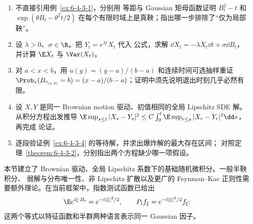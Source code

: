 \begin{exercise}
\begin{enumerate}
  \item 不直接引用例~\ref{ex:6-4-3-1}，分别用 \Ito{} 等距与 Gaussian 矩母函数证明
  $B_t^2-t$ 和
  $\exp(\theta B_t-\theta^2t/2)$ 在每个有限时域上是真鞅；指出哪一步排除了“仅为局部鞅”。
  \item 设 $\lambda>0$、$\sigma\in\R$。把
  $Y_t=e^{\lambda t}X_t$ 代入 \Ito{} 公式，求解
  $\dd X_t=-\lambda X_t\dd t+\sigma\dd B_t$，并计算 $\E X_t$ 与 $\Var(X_t)$。
  \item 对 $a<x<b$，用 $u(y)=(y-a)/(b-a)$ 和连续时间可选抽样重证
  $\Prob_x(B_{\tau_{(a,b)}}=b)=(x-a)/(b-a)$；证明中须先说明退出时刻几乎必然有限。
  \item 设 $X,Y$ 是同一 Brownian motion 驱动、初值相同的全局 Lipschitz SDE 解。
  从积分方程出发推导
  $\E\sup_{s\le t}|X_s-Y_s|^2\le C\int_0^t
  \E\sup_{r\le s}|X_r-Y_r|^2\dd s$，再完成 \Gronwall{} 论证。
  \item 逐段验证例~\ref{ex:6-4-3-4} 的等待解，并求出爆炸解的最大存在区间；
  对照定理~\ref{theorem:6-4-3-2}，分别指出两个方程缺少哪一项假设。
\end{enumerate}
\end{exercise}

本节建立了 Brownian 驱动、全局 Lipschitz 系数下的基础随机微积分。一般半鞅积分、
弱解与分布唯一性、非 Lipschitz 扩散以及更广的 Feynman--Kac 正则性需要额外理论。在当前框架中，指数测试函数已给出
\[
 \E e^{i\xi\cdot B_t}=e^{-t|\xi|^2/2},
 \qquad
 P_tf_\xi=e^{-t|\xi|^2/2}f_\xi;
\]
这两个等式以特征函数和半群两种语言表示同一 Gaussian 因子。
